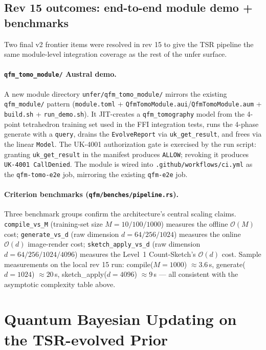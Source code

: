 \documentclass[11pt, a4paper]{article}
\begin{document}
\subsection{Rev 15 outcomes: end-to-end module demo + benchmarks}

Two final v2 frontier items were resolved in rev 15 to give the TSR
pipeline the same module-level integration coverage as the rest of the
unfer surface.

\paragraph{\texttt{qfm\_tomo\_module/} Austral demo.} A new module
directory \texttt{unfer/qfm\_tomo\_module/} mirrors the existing
\texttt{qfm\_module/} pattern (\texttt{module.toml} +
\texttt{QfmTomoModule.aui}/\texttt{QfmTomoModule.aum} +
\texttt{build.sh} + \texttt{run\_demo.sh}). It JIT-creates a
\texttt{qfm\_tomography} model from the 4-point tetrahedron training set
used in the FFI integration tests, runs the 4-phase generate with a
\texttt{query}, drains the \texttt{EvolveReport} via
\texttt{uk\_get\_result}, and frees via the linear \texttt{Model}. The
UK-4001 authorization gate is exercised by the run script: granting
\texttt{uk\_get\_result} in the manifest produces \texttt{ALLOW};
revoking it produces \texttt{UK-4001 CallDenied}. The module is wired
into \texttt{.github/workflows/ci.yml} as the \texttt{qfm-tomo-e2e}
job, mirroring the existing \texttt{qfm-e2e} job.

\paragraph{Criterion benchmarks (\texttt{qfm/benches/pipeline.rs}).}
Three benchmark groups confirm the architecture's central scaling
claims. \texttt{compile\_vs\_M} (training-set size $M=10/100/1000$)
measures the offline $\mathcal{O}(M)$ cost; \texttt{generate\_vs\_d}
(raw dimension $d=64/256/1024$) measures the online $\mathcal{O}(d)$
image-render cost; \texttt{sketch\_apply\_vs\_d} (raw dimension
$d=64/256/1024/4096$) measures the Level~1 Count-Sketch's $\mathcal{O}(d)$
cost. Sample measurements on the local rev 15 run: compile($M=1000$)
$\approx 3.6$\,s, generate($d=1024$) $\approx 20$\,\textmu s,
sketch\_apply($d=4096$) $\approx 9$\,\textmu s --- all consistent with
the asymptotic complexity table above.

\section{Quantum Bayesian Updating on the TSR-evolved Prior}
\label{sec:bayes}
\end{document}
